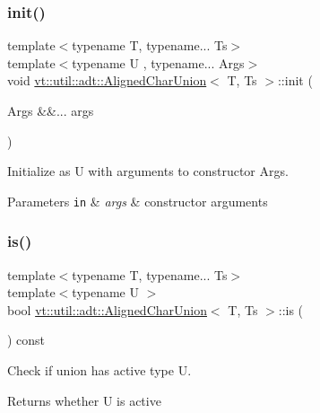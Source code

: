 \subsubsection{\texorpdfstring{init()}{init()}}
{\footnotesize\ttfamily template$<$typename T, typename... Ts$>$ \\
template$<$typename U , typename... Args$>$ \\
void \hyperlink{structvt_1_1util_1_1adt_1_1_aligned_char_union}{vt\+::util\+::adt\+::\+Aligned\+Char\+Union}$<$ T, Ts $>$\+::init (\begin{DoxyParamCaption}\item[{Args \&\&...}]{args }\end{DoxyParamCaption})\hspace{0.3cm}{\ttfamily [inline]}}



Initialize as {\ttfamily U} with arguments to constructor {\ttfamily Args}. 


\begin{DoxyParams}[1]{Parameters}
\mbox{\tt in}  & {\em args} & constructor arguments \\
\hline
\end{DoxyParams}
\mbox{\label{structvt_1_1util_1_1adt_1_1_aligned_char_union_af78cf3c2f5b904d1f49ee19f0ac7871f}} 
\subsubsection{\texorpdfstring{is()}{is()}}
{\footnotesize\ttfamily template$<$typename T, typename... Ts$>$ \\
template$<$typename U $>$ \\
bool \hyperlink{structvt_1_1util_1_1adt_1_1_aligned_char_union}{vt\+::util\+::adt\+::\+Aligned\+Char\+Union}$<$ T, Ts $>$\+::is (\begin{DoxyParamCaption}{ }\end{DoxyParamCaption}) const\hspace{0.3cm}{\ttfamily [inline]}}



Check if union has active type {\ttfamily U}. 

\begin{DoxyReturn}{Returns}
whether {\ttfamily U} is active 
\end{DoxyReturn}
\mbox{\label{structvt_1_1util_1_1adt_1_1_aligned_char_union_a30e1323df5870ce0763e90a3d3caa0c9}} 
